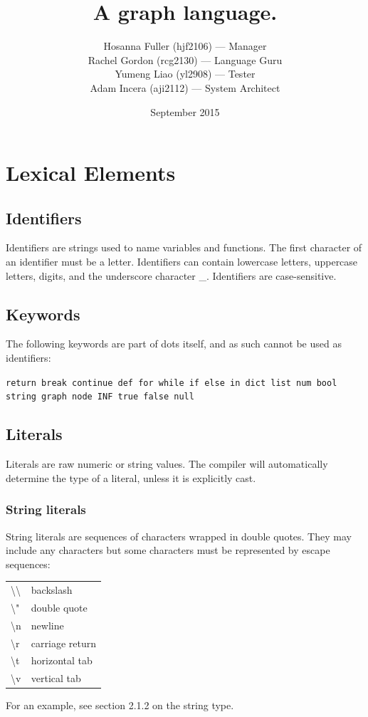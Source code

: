 \documentclass{article}
\title{A graph language.}
\author{Hosanna Fuller (hjf2106) --- Manager\\
Rachel Gordon (rcg2130) --- Language Guru\\
Yumeng Liao (yl2908) --- Tester\\
Adam Incera (aji2112) --- System Architect}
\date{September 2015}
\newcommand{\code}[1]{\texttt{#1}} %
\begin{document}
\maketitle

\tableofcontents
\newpage

\section{Lexical Elements}

\subsection{Identifiers}

Identifiers are strings used to name variables and functions. 
The first character of an identifier must be a letter. Identifiers can contain lowercase letters, uppercase letters, digits, and the underscore character \textquotesingle\_\textquotesingle. Identifiers are case-sensitive. 

\subsection{Keywords}

The following keywords are part of dots itself, and as such cannot be used as 
identifiers:

\code{return break continue def for while if else in 
 dict list num bool string graph node INF true false null}

\subsection{Literals}

Literals are raw numeric or string values. The compiler will automatically 
determine the type of a literal, unless it is explicitly cast.

\subsubsection{String literals}

String literals are sequences of characters wrapped in double quotes. They may 
include any characters but some characters must be represented by escape 
sequences:

\begin{table}[H]
\begin{tabular}{ p{0.5in}  p{2.75in} }
{\textbackslash}{\textbackslash} & backslash \\
{\textbackslash}" & double quote \\
{\textbackslash}n & newline \\
{\textbackslash}r & carriage return \\
{\textbackslash}t & horizontal tab \\
{\textbackslash}v & vertical tab \\
\end{tabular}
\label{tbl:escapes}
\end{table}
For an example, see section 2.1.2 on the string type.
\end{document}
